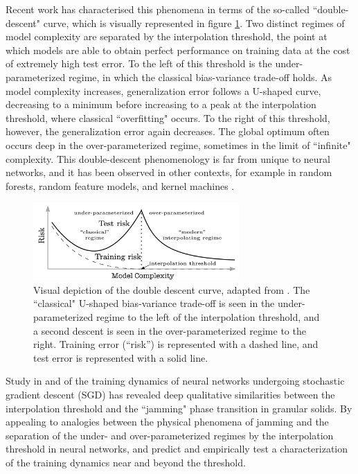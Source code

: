 \documentclass[a4paper, 12pt]{article}
\begin{document}
Recent work \cite{belkinReconcilingModernMachine2019} has characterised this phenomena in terms of the so-called ``double-descent" curve, which is visually represented in figure \ref{doubledescent}. Two distinct regimes of model complexity are separated by the interpolation threshold, the point at which models are able to obtain perfect performance on training data at the cost of extremely high test error. To the left of this threshold is the under-parameterized regime, in which the classical bias-variance trade-off holds. As model complexity increases, generalization error follows a U-shaped curve, decreasing to a minimum before increasing to a peak at the interpolation threshold, where classical ``overfitting" occurs. To the right of this threshold, however, the generalization error again decreases. The global optimum often occurs deep in the over-parameterized regime, sometimes in the limit of ``infinite" complexity. This double-descent phenomenology is far from unique to neural networks, and it has been observed in other contexts, for example in random forests, random feature models, and kernel machines \cite{ belkinReconcilingModernMachine2019, belkinUnderstandDeepLearning2018}.\\

\begin{figure}[ht]
\centering
\includegraphics[width=0.7\textwidth]{docs/assets/double_descent_reconciling.png}
\caption{Visual depiction of the double descent curve, adapted from \cite{belkinReconcilingModernMachine2019}. The ``classical" U-shaped bias-variance trade-off is seen in the under-parameterized regime to the left of the interpolation threshold, and a second descent is seen in the over-parameterized regime to the right. Training error (``risk'') is represented with a dashed line, and test error is represented with a solid line.}
\label{doubledescent}
\end{figure}


Study in \cite{baity-jesiComparingDynamicsDeep2019} and \cite{geigerJammingTransitionParadigm2019} of the training dynamics of neural networks undergoing stochastic gradient descent (SGD)  has revealed deep qualitative similarities between the interpolation threshold and the ``jamming" phase transition in granular solids. By appealing to analogies between the physical phenomena of jamming and the separation of the under- and over-parameterized regimes by the interpolation threshold in neural networks, \cite{geigerJammingTransitionParadigm2019} and \cite{spiglerJammingTransitionOverparametrization2019} predict and empirically test a characterization of the training dynamics near and beyond the threshold. 
\end{document}
